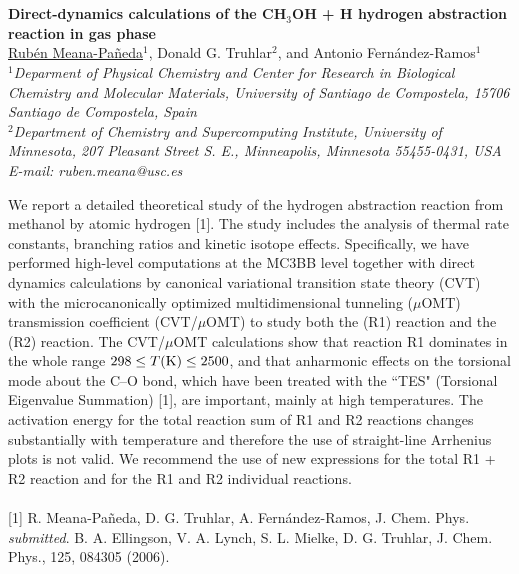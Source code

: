 \section*{}
\setcounter{figure}{0}
\begin{center}
{\bf \Large \bf  Direct-dynamics calculations of the CH$_3$OH + H hydrogen abstraction reaction in gas phase}
\\
\vspace{0.5cm}
\underline{Rubén Meana-Pañeda}$^1$, Donald G. Truhlar$^2$, and Antonio Fernández-Ramos$^1$ 
\\
\vspace{0.5cm}
{\it
$^1$Deparment of Physical Chemistry and Center for Research in Biological Chemistry and Molecular Materials, University of Santiago de Compostela, 15706 Santiago de Compostela, Spain
\\
$^2$Department of Chemistry and Supercomputing Institute, University of Minnesota, 207 Pleasant Street S. E., Minneapolis, Minnesota 55455-0431, USA
}
\\
\vspace{0.5cm}
{\it E-mail: ruben.meana@usc.es}
\\
\vspace{0.5cm}
\end{center}
We report a detailed theoretical study of the hydrogen abstraction reaction from methanol by atomic hydrogen [1]. 
The study includes the analysis of thermal rate constants, branching ratios and kinetic isotope effects. 
Specifically, we have performed high-level computations at the MC3BB level together with direct dynamics 
calculations by canonical variational transition state theory (CVT) with the microcanonically optimized 
multidimensional tunneling ($\mu$OMT) transmission coefficient (CVT/$\mu$OMT) to study both the
  (R1) reaction and the  (R2) reaction. 
The CVT/$\mu$OMT calculations show that reaction R1 dominates in the whole range $298\leq T(\rm K)\leq 2500$,
 and that anharmonic effects on the torsional mode about the C--O bond, which have been treated with the 
``TES" (Torsional Eigenvalue Summation) [1], are important, mainly at high temperatures.
 The activation energy for the total reaction sum of R1 and R2 reactions changes substantially with temperature
 and therefore the use of straight-line Arrhenius plots is not valid. We recommend the use of new expressions 
for the total R1 + R2 reaction and for the R1 and R2 individual reactions.
\\
\vspace{0.5cm}
\\
{\footnotesize
 [1] R. Meana-Pañeda, D. G. Truhlar, A. Fernández-Ramos, J. Chem. Phys. {\it submitted}.
\newline
 [2] B. A. Ellingson, V. A. Lynch, S. L. Mielke, D. G. Truhlar, J. Chem. Phys., 125, 084305 (2006).
}
\newpage
